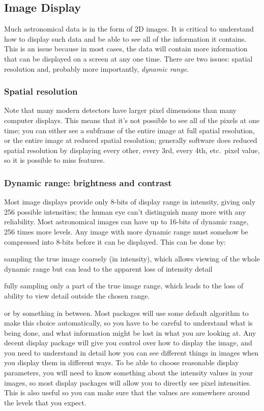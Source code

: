 \documentclass{article}
\begin{document}
\subsection*{Image Display}
Much astronomical data is in the form of 2D images. It is critical to
understand how to display such data and be able to see all of the
information it contains. This is an issue because in most cases, the
data will contain more information that can be displayed on a screen
at any one time. There are two issues: spatial resolution and,
probably more importantly, \emph{dynamic range}.


\subsubsection*{Spatial resolution}
Note that many modern detectors have larger pixel dimensions than many
computer displays. This means that it's not possible to see all of the
pixels at one time; you can either see a subframe of the entire image
at full spatial resolution, or the entire image at reduced spatial
resolution; generally software does reduced spatial resolution by
displaying every other, every 3rd, every 4th, etc.\ pixel value, so it
is possible to miss features.

\subsubsection*{Dynamic range: brightness and contrast}
Most image displays provide only 8-bits of display range in intensity,
giving only 256 possible intensities; the human eye can't
distinguish many more with any reliability. Most
astronomical images can have up to 16-bits of dynamic range, 256 times
more levels. Any image with more dynamic range must somehow be
compressed into 8-bits before it can be displayed. This can be done
by:
\begin{itemize*}
    \item sampling the true image coarsely (in intensity), which
        allows viewing of the whole dynamic range but can lead to the apparent
        loss of intensity detail
    \item fully sampling only a part of the true image range,
        which leads to the loss of ability to view detail outside
        the chosen range.
\end{itemize*}
or by something in between. Most packages will use
some default algorithm to make this choice automatically, so you have
to be careful to understand what is being done, and what information
might be lost in what you are looking at. Any decent display package
will give you control over how to display the image, and you need to
understand in detail how you can see different things in images when
you display them in different ways. To be able to choose reasonable
display parameters, you will need to know something about the
intensity values in your images, so most display packages will allow
you to directly see pixel intensities. This is also useful so you can
make sure that the values are somewhere around the levels that you
expect.
\end{document}

